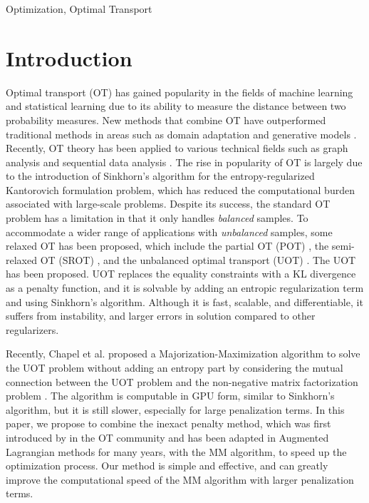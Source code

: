 \documentclass[conference]{IEEEtran}
\begin{document}
\begin{IEEEkeywords}
Optimization, Optimal Transport
\end{IEEEkeywords}

\section{Introduction}
\label{sec:int}

Optimal transport (OT) has gained popularity in the fields of machine learning and statistical learning due to its ability to measure the distance between two probability measures. New methods that combine OT have outperformed traditional methods in areas such as domain adaptation \cite{Courty_PAMI_2017} and generative models \cite{arjovsky2017wasserstein}. Recently, OT theory has been applied to various technical fields such as graph analysis \cite{Huang_SigPro_2020,Huang_ICASSP_2021,Fang_AAAI_2023} and sequential data analysis \cite{Horie_EUSIPCO_2022}. The rise in popularity of OT is largely due to the introduction of Sinkhorn's algorithm \cite{Cuturi_NIPS_2013} for the entropy-regularized Kantorovich formulation problem, which has reduced the computational burden associated with large-scale problems. Despite its success, the standard OT problem has a limitation in that it only handles {\it balanced} samples. To accommodate a wider range of applications with {\it unbalanced} samples, some relaxed OT has been proposed, which include the partial OT (POT) \cite{ferradans2013regularized}, the semi-relaxed OT (SROT) \cite{fukunaga_icassp2022,fukunaga_srsinkhorn}, and the unbalanced optimal transport (UOT) \cite{Caffarelli_AM_2010,chizat2017scaling}. The UOT has been proposed. UOT replaces the equality constraints with a KL divergence as a penalty function, and it is solvable by adding an entropic regularization term and using Sinkhorn's algorithm. Although it is fast, scalable, and differentiable, it suffers from instability, and larger errors in solution compared to other regularizers.

Recently, Chapel et al. proposed a Majorization-Maximization algorithm to solve the UOT problem without adding an entropy part by considering the mutual connection between the UOT problem and the non-negative matrix factorization problem \cite{Chapel_NeurIPS_2021}. The algorithm is computable in GPU form, similar to Sinkhorn's algorithm, but it is still slower, especially for large penalization terms. In this paper, we propose to combine the inexact penalty method, which was first introduced by \cite{pmlr-v115-xie20b} in the OT community and has been adapted in Augmented Lagrangian methods for many years, with the MM algorithm, to speed up the optimization process. Our method is simple and effective, and can greatly improve the computational speed of the MM algorithm with larger penalization terms.
\end{document}
